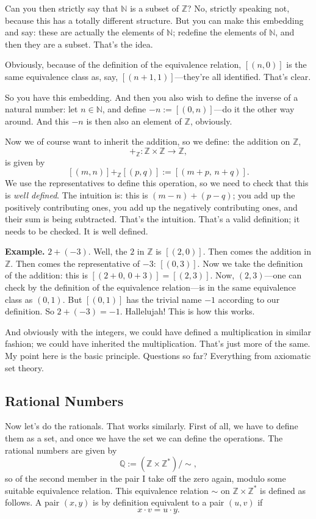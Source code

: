 Can you then strictly say that $\mathbb{N}$ is a subset of $\mathbb{Z}$? No, strictly speaking not, because this has a totally different structure. But you can make this embedding and say: these are actually the elements of $\mathbb{N}$; redefine the elements of $\mathbb{N}$, and then they are a subset. That's the idea.

Obviously, because of the definition of the equivalence relation, $[(n, 0)]$ is the same equivalence class as, say, $[(n+1, 1)]$---they're all identified. That's clear.

So you have this embedding. And then you also wish to define the inverse of a natural number: let $n \in \mathbb{N}$, and define $-n := [(0, n)]$---do it the other way around. And this $-n$ is then also an element of $\mathbb{Z}$, obviously.

Now we of course want to inherit the addition, so we define: the addition on $\mathbb{Z}$,
\[
+_{\mathbb{Z}} : \mathbb{Z} \times \mathbb{Z} \to \mathbb{Z},
\]
is given by
\[
[(m, n)] +_{\mathbb{Z}} [(p, q)] := [(m + p,\, n + q)].
\]
We use the representatives to define this operation, so we need to check that this is \emph{well defined}. The intuition is: this is $(m - n) + (p - q)$; you add up the positively contributing ones, you add up the negatively contributing ones, and their sum is being subtracted. That's the intuition. That's a valid definition; it needs to be checked. It is well defined.

\textbf{Example.} $2 + (-3)$. Well, the $2$ in $\mathbb{Z}$ is $[(2, 0)]$. Then comes the addition in $\mathbb{Z}$. Then comes the representative of $-3$: $[(0, 3)]$. Now we take the definition of the addition: this is $[(2 + 0,\, 0 + 3)] = [(2, 3)]$. Now, $(2, 3)$---one can check by the definition of the equivalence relation---is in the same equivalence class as $(0, 1)$. But $[(0, 1)]$ has the trivial name $-1$ according to our definition. So $2 + (-3) = -1$. Hallelujah! This is how this works.

And obviously with the integers, we could have defined a multiplication in similar fashion; we could have inherited the multiplication. That's just more of the same. My point here is the basic principle. Questions so far? Everything from axiomatic set theory.

\subsection*{Rational Numbers}

Now let's do the rationals. That works similarly. First of all, we have to define them as a set, and once we have the set we can define the operations. The rational numbers are given by
\[
\mathbb{Q} := (\mathbb{Z} \times \mathbb{Z}^*) / {\sim},
\]
so of the second member in the pair I take off the zero again, modulo some suitable equivalence relation. This equivalence relation $\sim$ on $\mathbb{Z} \times \mathbb{Z}^*$ is defined as follows. A pair $(x, y)$ is by definition equivalent to a pair $(u, v)$ if
\[
x \cdot v = u \cdot y.
\]

